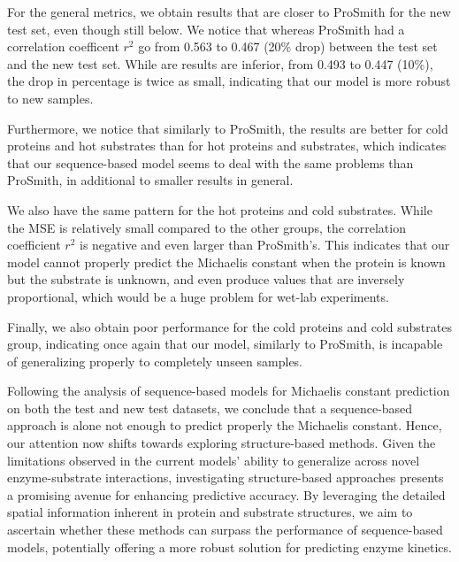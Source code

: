 For the general metrics, we obtain results that are closer to ProSmith for the new test set, even though still below. We notice that whereas ProSmith had a correlation coefficent $r^2$ go from 0.563 to 0.467 (20\% drop) between the test set and the new test set. While are results are inferior, from 0.493 to 0.447 (10\%), the drop in percentage is twice as small, indicating that our model is more robust to new samples.

Furthermore, we notice that similarly to ProSmith, the results are better for cold proteins and hot substrates than for hot proteins and substrates, which indicates that our sequence-based model seems to deal with the same problems than ProSmith, in additional to smaller results in general.

We also have the same pattern for the hot proteins and cold substrates. While the MSE is relatively small compared to the other groups, the correlation coefficient $r^2$ is negative and even larger than ProSmith's. This indicates that our model cannot properly predict the Michaelis constant when the protein is known but the substrate is unknown, and even produce values that are inversely proportional, which would be a huge problem for wet-lab experiments.

Finally, we also obtain poor performance for the cold proteins and cold substrates group, indicating once again that our model, similarly to ProSmith, is incapable of generalizing properly to completely unseen samples.

Following the analysis of sequence-based models for Michaelis constant prediction on both the test and new test datasets, we conclude that a sequence-based approach is alone not enough to predict properly the Michaelis constant. Hence, our attention now shifts towards exploring structure-based methods. Given the limitations observed in the current models' ability to generalize across novel enzyme-substrate interactions, investigating structure-based approaches presents a promising avenue for enhancing predictive accuracy. By leveraging the detailed spatial information inherent in protein and substrate structures, we aim to ascertain whether these methods can surpass the performance of sequence-based models, potentially offering a more robust solution for predicting enzyme kinetics.